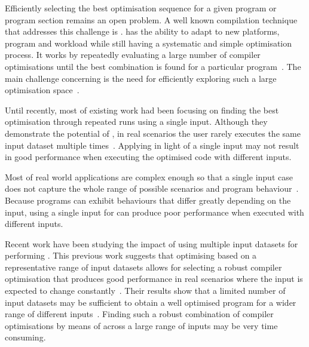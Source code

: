 Efficiently selecting the best optimisation sequence for a given program or program section remains an open problem.
A well known compilation technique that addresses this challenge is {\itercomp}.
{\Itercomp} has the ability to adapt to new platforms, program and workload while still having a systematic and simple optimisation process.
It works by repeatedly evaluating a large number of compiler optimisations until the best combination is found for a particular program~\citep{fursin07,chen10}.
The main challenge concerning {\itercomp} is the need for efficiently exploring such a large optimisation space~\citep{fursin07,cavazos07,zhou12}.

Until recently, most of existing work  had been focusing on finding the best optimisation through repeated runs using a single input.
Although they demonstrate the potential of {\itercomp}, in real scenarios the user rarely executes the same input dataset multiple times~\citep{bodin98,kisuki99,stephenson03,kulkarni04,agakov06}.
Applying {\itercomp} in light of a single input may not result in good performance when executing the optimised code with different inputs.

Most of real world applications are complex enough so that a single input case does not capture the whole range of possible scenarios and program behaviour~\citep{haneda06,fursin07,chen10,chen12a}.
Because programs can exhibit behaviours that differ greatly depending on the input,
using a single input for {\itercomp} can produce poor performance when executed with different inputs.

Recent work have been studying the impact of using multiple input datasets for performing {\itercomp}.
This previous work suggests that optimising based on a representative range of input datasets allows for selecting a robust compiler optimisation that produces good performance in real scenarios where the input is expected to change constantly~\citep{haneda06,fursin07,chen10,chen12a,chen12b,fang15,mpeis16}.
Their results show that a limited number of input datasets may be sufficient to obtain a well optimised program for a wider range of different inputs~\citep{haneda06,fursin07,chen10,chen12a}.
Finding such a robust combination of compiler optimisations by means of {\itercomp} across a large range of inputs may be very time consuming.

